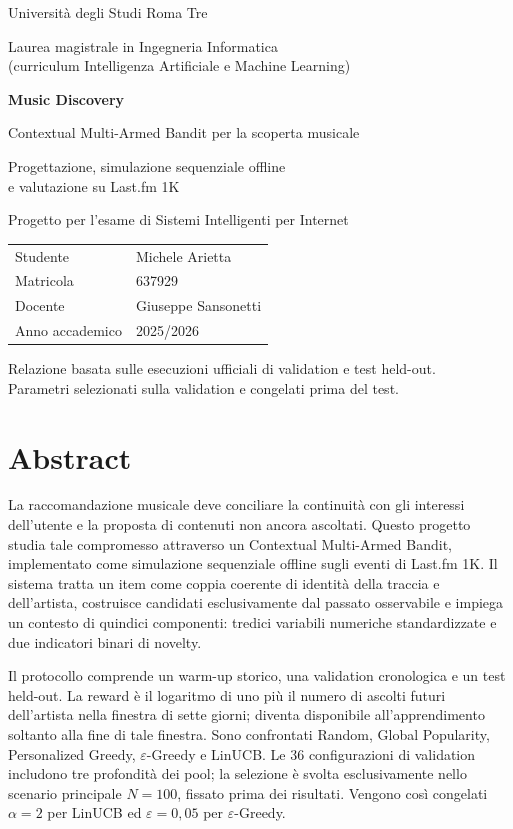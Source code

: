 \documentclass[11pt,a4paper,oneside]{report}
\newcommand{\autore}{Michele Arietta}
\newcommand{\matricola}{637929}
\newcommand{\corsostudi}{Laurea magistrale in Ingegneria Informatica\\[.15cm](curriculum Intelligenza Artificiale e Machine Learning)}
\newcommand{\docente}{Giuseppe Sansonetti}
\newcommand{\annoaccademico}{2025/2026}
\begin{document}
\hypersetup{pageanchor=false}
\begin{titlepage}
\centering
{\Large Università degli Studi Roma Tre\par}
\vspace{.5cm}
{\large \corsostudi\par}
\vspace{1.8cm}
{\Huge\bfseries Music Discovery\par}
\vspace{.35cm}
{\LARGE Contextual Multi-Armed Bandit per la scoperta musicale\par}
\vspace{.8cm}
{\large Progettazione, simulazione sequenziale offline\\e valutazione su Last.fm 1K\par}
\vfill
{\large Progetto per l'esame di Sistemi Intelligenti per Internet\par}
\vspace{.8cm}
\begin{tabular}{ll}
Studente & \autore\\
Matricola & \matricola\\
Docente & \docente\\
Anno accademico & \annoaccademico
\end{tabular}
\vfill
{\small Relazione basata sulle esecuzioni ufficiali di validation e test held-out.\\
Parametri selezionati sulla validation e congelati prima del test.}
\end{titlepage}
\hypersetup{pageanchor=true}
\chapter*{Abstract}
La raccomandazione musicale deve conciliare la continuità con gli interessi dell'utente e la proposta di contenuti non ancora ascoltati. Questo progetto studia tale compromesso attraverso un Contextual Multi-Armed Bandit, implementato come simulazione sequenziale offline sugli eventi di Last.fm 1K. Il sistema tratta un item come coppia coerente di identità della traccia e dell'artista, costruisce candidati esclusivamente dal passato osservabile e impiega un contesto di quindici componenti: tredici variabili numeriche standardizzate e due indicatori binari di novelty.

Il protocollo comprende un warm-up storico, una validation cronologica e un test held-out. La reward è il logaritmo di uno più il numero di ascolti futuri dell'artista nella finestra di sette giorni; diventa disponibile all'apprendimento soltanto alla fine di tale finestra. Sono confrontati Random, Global Popularity, Personalized Greedy, $\varepsilon$-Greedy e LinUCB. Le 36 configurazioni di validation includono tre profondità dei pool; la selezione è svolta esclusivamente nello scenario principale $N=100$, fissato prima dei risultati. Vengono così congelati $\alpha=2$ per LinUCB ed $\varepsilon=0{,}05$ per $\varepsilon$-Greedy.
\end{document}
